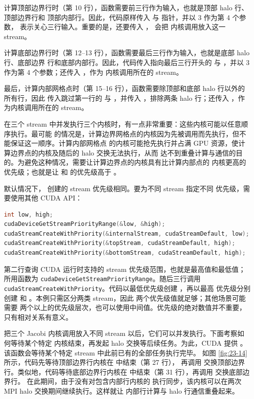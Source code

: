 计算顶部边界行时（第 10 行），函数需要前三行作为输入，也就是顶部 halo 行、顶部边界行和
顶部内部行。因此，代码原样传入  与  指针，并以 3 作为第 4 个参数，
表示关心三行输入。重要的是，还要传入 ， 会把
内核调用放入这一 stream。

计算底部边界行时（第 12--13 行），函数需要最后三行作为输入，也就是底部 halo 行、底部边界
行和底部内部行。因此，代码传入指向最后三行开头的  与
，并以 3 作为第 4 个参数；还传入 ，作为
内核调用所在的 stream。

最后，计算内部网格点时（第 15--16 行），函数需要除顶部和底部 halo 行以外的所有行，因此
传入跳过第一行的  与 ，并传入 ，排除两条
halo 行；还传入 ，作为内核调用所在的 stream。

在三个 stream 中并发执行三个内核时，有一点非常重要：这些内核可能以任意顺序执行。最可能
的情况是，计算边界网格点的内核因为先被调用而先执行，但不能保证这一顺序。计算内部网格点
的内核可能抢先执行并占满 GPU 资源，使计算边界点的内核及随后的 halo 交换无法执行，从而
达不到重叠计算与通信的目的。为避免这种情况，需要让计算边界点的内核具有比计算内部点的
内核更高的优先级；也就是让  和  的优先级高于
。

默认情况下， 创建的 stream 优先级相同。要为不同 stream 指定不同
优先级，需要使用其他 CUDA API：

\begin{lstlisting}[language=C++,numbers=none]
int low, high;
cudaDeviceGetStreamPriorityRange(&low, &high);
cudaStreamCreateWithPriority(&internalStream, cudaStreamDefault, low);
cudaStreamCreateWithPriority(&topStream, cudaStreamDefault, high);
cudaStreamCreateWithPriority(&bottomStream, cudaStreamDefault, high);
\end{lstlisting}

第二行查询 CUDA 运行时支持的 stream 优先级范围，也就是最高值和最低值；所用函数为
\texttt{cudaDeviceGetStream\allowbreak PriorityRange}。随后三行调用
\texttt{cudaStreamCreate\allowbreak WithPriority}。代码以最低优先级创建
，再以最高
优先级分别创建  和 。本例只需区分两类 stream，因此
两个优先级值就足够；其他场景可能需要
两个以上的优先级层次，也可以使用中间值。优先级的绝对数值并不重要，只有相对关系有意义。

把三个 Jacobi 内核调用放入不同 stream 以后，它们可以并发执行。下面考察如何等待某个特定
内核结束，再发起 halo 交换等后续任务。为此，CUDA 提供
。该函数会等待某个特定 stream 中此前已有的全部任务执行完毕。
如图 \ref{fig:23-14} 所示，代码先等待顶部边界行内核在  中结束（第 27 行），
再调用  交换顶部边界行。类似地，代码等待底部边界行内核在
 中结束（第 31 行），再调用  交换底部边界行。
在此期间，由于没有对包含内部行内核的
 执行同步，该内核可以在两次 MPI halo 交换期间继续执行。这样就让
内部行计算与 halo 行通信重叠起来。

